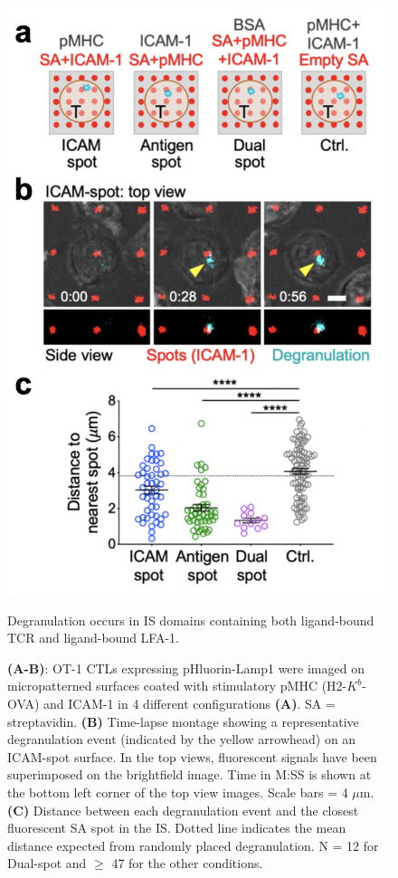 \begin{figure}[htbp]
	\centering
	\includegraphics[width=0.7\columnwidth]{../figures/chapter3/fig2stamping.png}
	\caption{Degranulation occurs in IS domains containing both ligand-bound TCR and ligand-bound LFA-1.}
	\caption*{\textbf{(A-B)}: OT-1 CTLs expressing pHluorin-Lamp1 were imaged on micropatterned surfaces coated with stimulatory pMHC (H2-$K^{b}$-OVA) and ICAM-1 in 4 different configurations \textbf{(A)}. SA = streptavidin. \textbf{(B)} Time-lapse montage showing a representative degranulation event (indicated by the yellow arrowhead) on an ICAM-spot surface. In the top views, fluorescent signals have been superimposed on the brightfield image. Time in M:SS is shown at the bottom left corner of the top view images. Scale bars = 4 $\mu$m. \textbf{(C)} Distance between each degranulation event and the closest fluorescent SA spot in the IS. Dotted line indicates the mean distance expected from randomly placed degranulation. N = 12 for Dual-spot and $\geq$ 47 for the other conditions.}
	\label{fig:fig2stamping}
\end{figure} 

